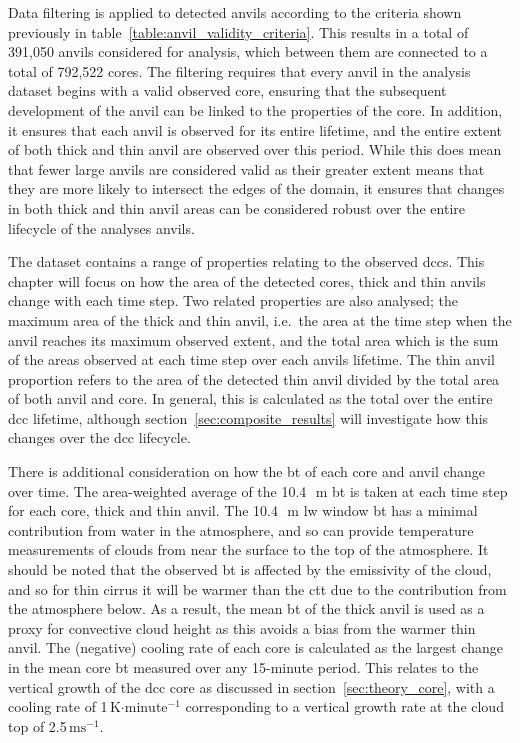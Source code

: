 Data filtering is applied to detected anvils according to the criteria shown previously in table~\ref{table:anvil_validity_criteria}.
This results in a total of 391,050 anvils considered for analysis, which between them are connected to a total of 792,522 cores.
The filtering requires that every anvil in the analysis dataset begins with a valid observed core, ensuring that the subsequent development of the anvil can be linked to the properties of the core.
In addition, it ensures that each anvil is observed for its entire lifetime, and the entire extent of both thick and thin anvil are observed over this period.
While this does mean that fewer large anvils are considered valid as their greater extent means that they are more likely to intersect the edges of the domain, it ensures that changes in both thick and thin anvil areas can be considered robust over the entire lifecycle of the analyses anvils.

The dataset contains a range of properties relating to the observed \acrshort{dcc}s.
This chapter will focus on how the area of the detected cores, thick and thin anvils change with each time step.
Two related properties are also analysed; the maximum area of the thick and thin anvil, i.e.\ the area at the time step when the anvil reaches its maximum observed extent, and the total area which is the sum of the areas observed at each time step over each anvils lifetime.
The thin anvil proportion refers to the area of the detected thin anvil divided by the total area of both anvil and core.
In general, this is calculated as the total over the entire \acrshort{dcc} lifetime, although section~\ref{sec:composite_results} will investigate how this changes over the \acrshort{dcc} lifecycle.

There is additional consideration on how the \acrshort{bt} of each core and anvil change over time.
The area-weighted average of the 10.4\,\unit{\mu m} \acrshort{bt} is taken at each time step for each core, thick and thin anvil.
The 10.4\,\unit{\mu m} \acrshort{lw} window \acrshort{bt} has a minimal contribution from water in the atmosphere, and so can provide temperature measurements of clouds from near the surface to the top of the atmosphere.
It should be noted that the observed \acrshort{bt} is affected by the emissivity of the cloud, and so for thin cirrus it will be warmer than the \acrshort{ctt} due to the contribution from the atmosphere below.
As a result, the mean \acrshort{bt} of the thick anvil is used as a proxy for convective cloud height as this avoids a bias from the warmer thin anvil.
The (negative) cooling rate of each core is calculated as the largest change in the mean core \acrshort{bt} measured over any 15-minute period.
This relates to the vertical growth of the \acrshort{dcc} core as discussed in section~\ref{sec:theory_core}, with a cooling rate of 1\,K$\cdot\mathrm{minute^{-1}}$ corresponding to a vertical growth rate at the cloud top of 2.5\,$\mathrm{ms^{-1}}$.

